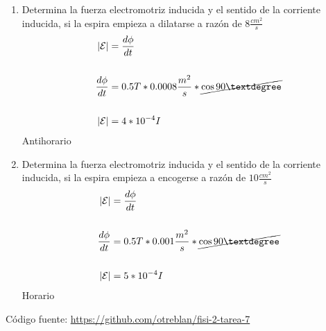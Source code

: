 \documentclass[10pt, twoside]{article}
\begin{document}
\begin{enumerate}[label=\alph*)]
	\item Determina la fuerza electromotriz inducida y el sentido de la
		corriente inducida, si la espira empieza a dilatarse a razón de
		$8 \frac{cm^2}{s} $
		\begin{align*}
			|\mathcal{E}| &= \frac{d\phi}{dt}\\
			\\
			\frac{d\phi}{dt} &= 0.5T* 0.0008 \frac{m^2}{s} * \cancel{\cos{90°}}\\
			\\
			|\mathcal{E}| &= 4*10^{-4}I
		\end{align*}
		Antihorario
	\item Determina la fuerza electromotriz inducida y el sentido de la
		corriente inducida, si la espira empieza a encogerse a razón de
		$10 \frac{cm^2}{s} $
		\begin{align*}
			|\mathcal{E}| &= \frac{d\phi}{dt}\\
			\\
			\frac{d\phi}{dt} &= 0.5T* 0.001 \frac{m^2}{s} * \cancel{\cos{90°}}\\
			\\
			|\mathcal{E}| &= 5*10^{-4}I
		\end{align*}
		Horario
\end{enumerate}

\vfill
Código fuente: \url{https://github.com/otreblan/fisi-2-tarea-7}
\end{document}
